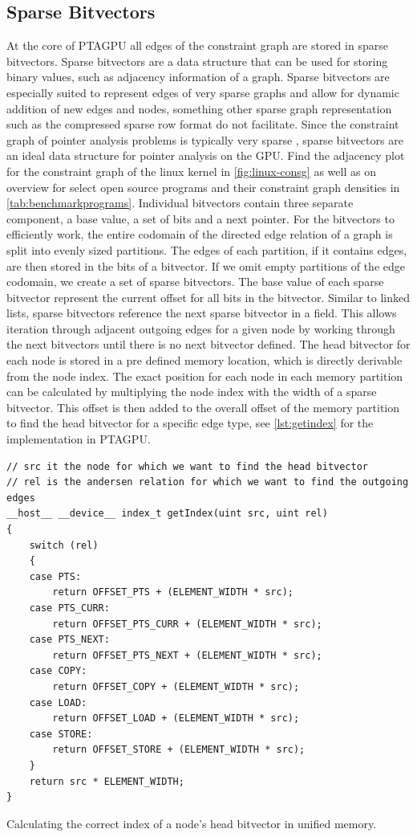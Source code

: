\subsection{Sparse Bitvectors}
At the core of PTAGPU all edges of the constraint graph are stored in sparse bitvectors.
Sparse bitvectors are a data structure that can be used for storing binary values, such as adjacency information of a graph. Sparse bitvectors are especially suited to represent edges of very sparse graphs and allow for dynamic addition of new edges and nodes, something other sparse graph representation such as the compressed sparse row format do not facilitate. Since the constraint graph of pointer analysis problems is typically very sparse \cite{mendez2012gpu}, sparse bitvectors are an ideal data structure for pointer analysis on the GPU. Find the adjacency plot for the constraint graph of the linux kernel in \autoref{fig:linux-consg} as well as on overview for select open source programs and their constraint graph densities in \autoref{tab:benchmarkprograms}.
Individual bitvectors contain three separate component, a base value, a set of bits and a next pointer.
For the bitvectors to efficiently work, the entire codomain of the directed edge relation of a graph is split into evenly sized partitions.
The edges of each partition, if it contains edges, are then stored in the bits of a bitvector. If we omit empty partitions of the edge codomain, we create a set of sparse bitvectors.
The base value of each sparse bitvector represent the current offset for all bits in the bitvector.
Similar to linked lists, sparse bitvectors reference the next sparse bitvector in a field. This allows iteration through adjacent outgoing edges for a given node by working through the next bitvectors until there is no next bitvector defined.
The head bitvector for each node is stored in a pre defined memory location, which is directly derivable from the node index.
The exact position for each node in each memory partition can be calculated by multiplying the node index with the width of a sparse bitvector. This offset is then added to the overall offset of the memory partition to find the head bitvector for a specific edge type, see \autoref{lst:getindex} for the implementation in PTAGPU.
\begin{listing}
    \begin{verbatim}
// src it the node for which we want to find the head bitvector
// rel is the andersen relation for which we want to find the outgoing edges
__host__ __device__ index_t getIndex(uint src, uint rel)
{
    switch (rel)
    {
    case PTS:
        return OFFSET_PTS + (ELEMENT_WIDTH * src);
    case PTS_CURR:
        return OFFSET_PTS_CURR + (ELEMENT_WIDTH * src);
    case PTS_NEXT:
        return OFFSET_PTS_NEXT + (ELEMENT_WIDTH * src);
    case COPY:
        return OFFSET_COPY + (ELEMENT_WIDTH * src);
    case LOAD:
        return OFFSET_LOAD + (ELEMENT_WIDTH * src);
    case STORE:
        return OFFSET_STORE + (ELEMENT_WIDTH * src);
    }
    return src * ELEMENT_WIDTH;
}
    \end{verbatim}
    \caption{Calculating the correct index of a node's head bitvector in unified memory.}
    \label{lst:getindex}
\end{listing}

